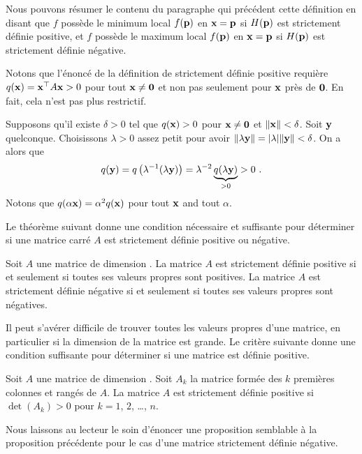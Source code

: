 {Nous pouvons résumer le contenu du paragraphe qui précédent cette définition
en disant que $f$ possède le minimum local $f(\mathbf{p})$ en
$\mathbf{x} = \mathbf{p}$ si $H(\mathbf{p})$ est strictement définie positive,
et $f$ possède le maximum local $f(\mathbf{p})$ en $\mathbf{x} = \mathbf{p}$
si $H(\mathbf{p})$ est strictement définie négative.

\begin{rmk}[\theory]
Notons que l'énoncé de la définition de strictement définie positive
requière $q(\mathbf{x}) = \mathbf{x}^\top A \mathbf{x} > 0$ pour tout
$\mathbf{x} \neq \mathbf{0}$ et non pas seulement pour $\mathbf{x}$ près de
$\mathbf{0}$.  En fait, cela n'est pas plus restrictif.  

Supposons qu'il existe $\delta >0$ tel que $q(\mathbf{x})>0$ pour
$\mathbf{x} \neq \mathbf{0}$ et $\|\mathbf{x}\| < \delta$.  Soit $\mathbf{y}$
quelconque.  Choisissons $\lambda >0$ assez petit pour avoir
$\|\lambda \mathbf{y}\| = |\lambda| \|\mathbf{y}\| < \delta$.  On a alors
que 
\[
  q(\VEC{y}) = q\left( \lambda^{-1} (\lambda \VEC{y})\right)
  = \lambda^{-2} \underbrace{q(\lambda \VEC{y})}_{>0} > 0 \ .
\]
Notons que $q(\alpha \mathbf{x}) = \alpha^2 q(\mathbf{x})$ pour tout
$\mathbf{x}$ and tout $\alpha$.
\end{rmk}

Le théorème suivant donne une condition nécessaire et suffisante pour
déterminer si une matrice carré $A$ est strictement définie positive
ou négative.

\begin{theorem}
Soit $A$ une matrice de dimension .  La matrice $A$ est 
strictement définie positive si et seulement si toutes ses valeurs
propres sont positives.  La matrice $A$ est strictement définie
négative si et seulement si toutes ses valeurs propres sont négatives.
\end{theorem}

Il peut s'avérer difficile de trouver toutes les valeurs propres d'une
matrice, en particulier si la dimension de la matrice est grande.
Le critère suivante donne une condition suffisante pour déterminer si
une matrice est définie positive.

\begin{prop}
Soit $A$ une matrice de dimension .   Soit $A_k$ la matrice
formée des $k$ premières colonnes et rangés de $A$.  La matrice $A$
est strictement définie positive si $\det(A_k) > 0$ pour $k=1$, $2$,
\ldots, $n$.
\end{prop}

Nous laissons au lecteur le soin d'énoncer une proposition semblable à la
proposition précédente pour le cas d'une matrice strictement définie
négative.

}
